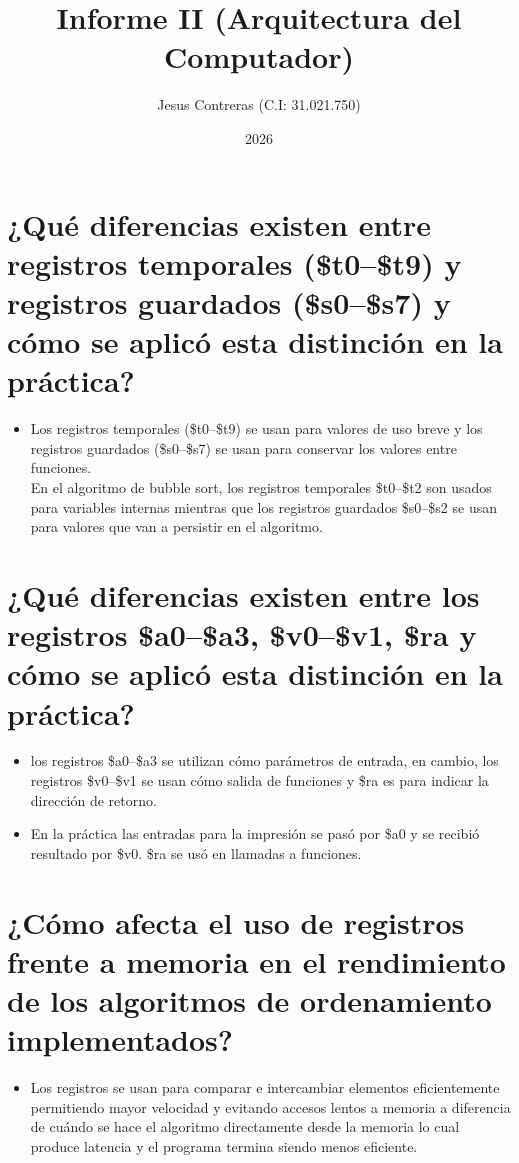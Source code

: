 \documentclass[12pt]{article}
\title{Informe II (Arquitectura del Computador)}
\author{Jesus Contreras (C.I: 31.021.750)}
\date{2026}
\begin{document}
\maketitle

\section{¿Qué diferencias existen entre registros temporales (\$t0--\$t9) y registros guardados (\$s0--\$s7) y cómo se aplicó esta distinción en la práctica?}
\begin{itemize}
    \item Los registros temporales (\$t0--\$t9) se usan para valores de uso breve y los registros guardados (\$s0--\$s7) se usan para conservar los valores entre funciones.
    \\En el algoritmo de bubble sort, los registros temporales \$t0--\$t2 son usados para variables internas mientras que los registros guardados \$s0--\$s2 se usan para valores que van a persistir en el algoritmo.
\end{itemize}

\section{¿Qué diferencias existen entre los registros \$a0–\$a3, \$v0–\$v1, \$ra y cómo se aplicó esta distinción en la práctica?}

\begin{itemize}
     \item los registros \$a0--\$a3 se utilizan cómo parámetros de entrada, en cambio, los registros \$v0--\$v1 se usan cómo salida de funciones y \$ra es para indicar la dirección de retorno.\\ 
   
   \item En la práctica las entradas para la impresión se pasó por \$a0 y se recibió resultado por \$v0. \$ra se usó en llamadas a funciones.
\end{itemize}

\section {¿Cómo afecta el uso de registros frente a memoria en el rendimiento de los algoritmos 
de ordenamiento implementados?}
\begin{itemize}
    \item Los registros se usan para comparar e intercambiar elementos eficientemente permitiendo mayor velocidad y evitando accesos lentos a memoria a diferencia de cuándo se hace el algoritmo directamente desde la memoria lo cual produce latencia y el programa termina siendo menos eficiente.
\end{itemize}
\end{document}
